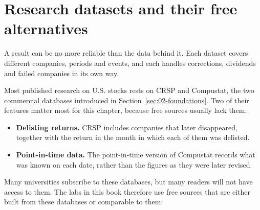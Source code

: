 \section{Research datasets and their free alternatives}
\label{sec:02-datasets}

A result can be no more reliable than the data behind it. Each dataset covers different companies, periods and events, and each handles corrections, dividends and failed companies in its own way. 

Most published research on U.S. stocks rests on CRSP and Compustat, the two commercial databases introduced in Section~\ref{sec:02-foundations}. Two of their features matter most for this chapter, because free sources usually lack them.

\begin{itemize}
  \item \textbf{Delisting returns.} CRSP includes companies that later disappeared, together with the return in the month in which each of them was delisted.
  \item \textbf{Point-in-time data.} The point-in-time version of Compustat records what was known on each date, rather than the figures as they were later revised.
\end{itemize}

Many universities subscribe to these databases, but many readers will not have access to them. The labs in this book therefore use free sources that are either built from these databases or comparable to them:

